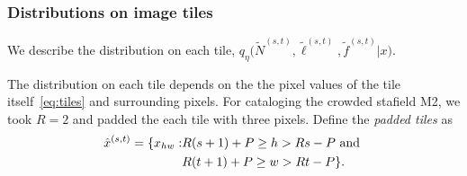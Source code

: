 
\subsubsection{Distributions on image tiles}
We describe the distribution on each tile, $q_\eta\big(\tilde N^{(s, t)}, \tilde \ell^{(s, t)}, \tilde f^{(s, t)} | x\big)$. 

The distribution on each tile depends on the the pixel values of the tile itself~\ref{eq:tiles}
and surrounding pixels. For cataloging 
the crowded stafield M2, we took $R = 2$ and padded the each tile with three pixels. Define the {\itshape padded tiles} as 
\begin{align}
    \hat x^{(s,t)} = 
    \{x_{hw} : & R(s+1) + P \geq h > Rs - P \text{ and } \notag \\
    & R(t+1) + P\geq w > Rt - P\}.
\end{align}


